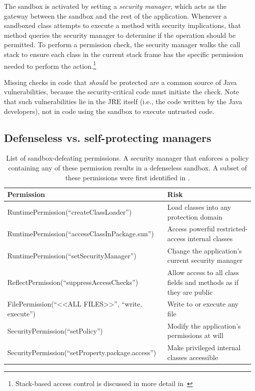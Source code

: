 \documentclass{sig-alternate}
\begin{document}
The sandbox is activated by setting a \emph{security manager}, which acts as the
gateway between the sandbox and the rest of the application. Whenever a
sandboxed class attempts to execute a method with security implications, that
method queries the security manager to determine if the operation should be
permitted. 
To perform a permission check, the security manager walks the call stack to
ensure each class in the current stack frame has the specific permission needed to
perform the action.\footnote{Stack-based access control is discussed in more
  detail
  in~\cite{banerjee_stack-based_2005,besson_stack_2004,d._s._wallach_understanding_1998,fournet_stack_2002}}

Missing checks in code that \emph{should} be protected are a common
source of Java vulnerabilities, because the security-critical code must initiate
the check.  Note that such vulnerabilities lie in the JRE itself (i.e., the code
written by the Java developers), not in code using the sandbox to
execute untrusted code.

\subsection{Defenseless vs. self-protecting managers}
\label{sec:secmanagers}

\begin{table}
\caption{List of sandbox-defeating permissions. A security manager that enforces
a policy containing any of these permission results
\label{tab:defenseless-permissions}
in a defenseless sandbox. A subset of these permissions were first identified in \cite{security_explorations_2012}. 
}
\begin{tabular}{ll}
\toprule 
\textbf{Permission} & \textbf{Risk}\tabularnewline
\midrule
RuntimePermission(``createClassLoader'') & Load classes into any protection domain\tabularnewline
RuntimePermission(``accessClassInPackage.sun'') & Access powerful restricted-access internal classes\tabularnewline
RuntimePermission(``setSecurityManager'') & Change the application's current security manager\tabularnewline
ReflectPermission(``suppressAccessChecks'') & Allow access to all class fields and methods as if they are public\tabularnewline
FilePermission(``<\textcompwordmark{}<ALL FILES>\textcompwordmark{}>'',
``write, execute'') & Write to or execute any file\tabularnewline
SecurityPermission(``setPolicy'') & Modify the application's permissions at will\tabularnewline
SecurityPermission(``setProperty.package.access'') & Make privileged internal classes accessible\tabularnewline
\bottomrule
\end{tabular}
\vspace{-0.5cm}
\end{table}
\end{document}
